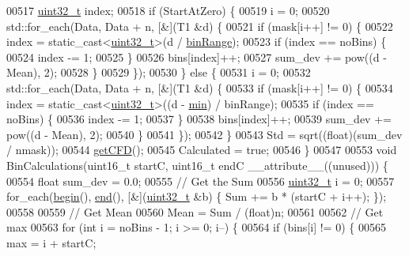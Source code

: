 \begin{DoxyCode}
00517     \hyperlink{_soil_math_types_8h_a435d1572bf3f880d55459d9805097f62}{uint32\_t} index;
00518     \textcolor{keywordflow}{if} (StartAtZero) \{
00519       i = 0;
00520       std::for\_each(Data, Data + n, [&](T1 &d) \{
00521         \textcolor{keywordflow}{if} (mask[i++] != 0) \{
00522           index = \textcolor{keyword}{static\_cast<}\hyperlink{_soil_math_types_8h_a435d1572bf3f880d55459d9805097f62}{uint32\_t}\textcolor{keyword}{>}(d / \hyperlink{class_soil_math_1_1_stats_a00be1d2a705a8aba532fbe726001bbb2}{binRange});
00523           \textcolor{keywordflow}{if} (index == noBins) \{
00524             index -= 1;
00525           \}
00526           bins[index]++;
00527           sum\_dev += pow((d - Mean), 2);
00528         \}
00529       \});
00530     \} \textcolor{keywordflow}{else} \{
00531       i = 0;
00532       std::for\_each(Data, Data + n, [&](T1 &d) \{
00533         \textcolor{keywordflow}{if} (mask[i++] != 0) \{
00534           index = \textcolor{keyword}{static\_cast<}\hyperlink{_soil_math_types_8h_a435d1572bf3f880d55459d9805097f62}{uint32\_t}\textcolor{keyword}{>}((d - \hyperlink{class_soil_math_1_1_stats_aa44c07a23b1c2ce0f0407e7cee4f39a9}{min}) / binRange);
00535           \textcolor{keywordflow}{if} (index == noBins) \{
00536             index -= 1;
00537           \}
00538           bins[index]++;
00539           sum\_dev += pow((d - Mean), 2);
00540         \}
00541       \});
00542     \}
00543     Std = sqrt((\textcolor{keywordtype}{float})(sum\_dev / nmask));
00544     \hyperlink{class_soil_math_1_1_stats_a5508190fbea17bfec505ff8c47b1a45e}{getCFD}();
00545     Calculated = \textcolor{keyword}{true};
00546   \}
00547 
00553   \textcolor{keywordtype}{void} BinCalculations(uint16\_t startC, uint16\_t endC \_\_attribute\_\_((unused))) \{
00554     \textcolor{keywordtype}{float} sum\_dev = 0.0;
00555     \textcolor{comment}{// Get the Sum}
00556     \hyperlink{_soil_math_types_8h_a435d1572bf3f880d55459d9805097f62}{uint32\_t} i = 0;
00557     for\_each(\hyperlink{class_soil_math_1_1_stats_ab4b0109ffb55f1d39acfad46bfd3bad5}{begin}(), \hyperlink{class_soil_math_1_1_stats_a9d60ce82a2786e0422c3683c301f34ae}{end}(), [&](\hyperlink{_soil_math_types_8h_a435d1572bf3f880d55459d9805097f62}{uint32\_t} &b) \{ Sum += b * (startC + i++); \});
00558 
00559     \textcolor{comment}{// Get Mean}
00560     Mean = Sum / (float)n;
00561 
00562     \textcolor{comment}{// Get max}
00563     \textcolor{keywordflow}{for} (\textcolor{keywordtype}{int} i = noBins - 1; i >= 0; i--) \{
00564       \textcolor{keywordflow}{if} (bins[i] != 0) \{
00565         max = i + startC;

\end{DoxyCode}
